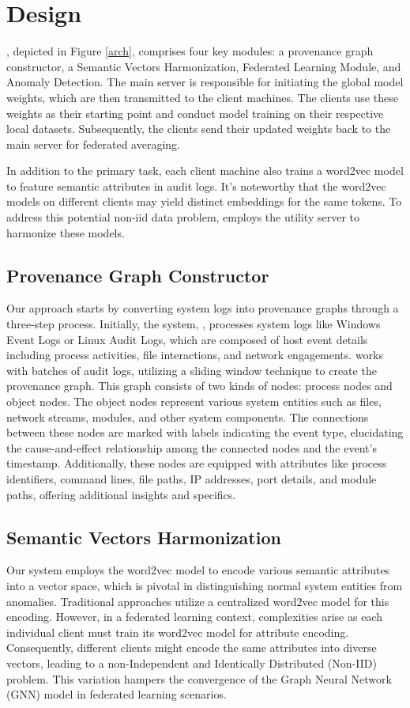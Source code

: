 \section{\Sys Design}
\label{sec:methodology}

\Sys, depicted in Figure \ref{arch}, comprises four key modules: a provenance graph constructor, a Semantic Vectors Harmonization, Federated Learning Module, and Anomaly Detection. The main server is responsible for initiating the global model weights, which are then transmitted to the client machines. The clients use these weights as their starting point and conduct model training on their respective local datasets. Subsequently, the clients send their updated weights back to the main server for federated averaging.

In addition to the primary task, each client machine also trains a word2vec model to feature semantic attributes in audit logs. It's noteworthy that the word2vec models on different clients may yield distinct embeddings for the same tokens. To address this potential non-iid data problem, \Sys employs the utility server to harmonize these models.

\subsection{Provenance Graph Constructor}
Our approach starts by converting system logs into provenance graphs through a three-step process. Initially, the system, \Sys, processes system logs like Windows Event Logs or Linux Audit Logs, which are composed of host event details including process activities, file interactions, and network engagements. \Sys works with batches of audit logs, utilizing a sliding window technique to create the provenance graph. This graph consists of two kinds of nodes: process nodes and object nodes. The object nodes represent various system entities such as files, network streams, modules, and other system components. The connections between these nodes are marked with labels indicating the event type, elucidating the cause-and-effect relationship among the connected nodes and the event's timestamp. Additionally, these nodes are equipped with attributes like process identifiers, command lines, file paths, IP addresses, port details, and module paths, offering additional insights and specifics.

\subsection{Semantic Vectors Harmonization}
Our system employs the word2vec model to encode various semantic attributes into a vector space, which is pivotal in distinguishing normal system entities from anomalies. Traditional approaches utilize a centralized word2vec model for this encoding. However, in a federated learning context, complexities arise as each individual client must train its word2vec model for attribute encoding. Consequently, different clients might encode the same attributes into diverse vectors, leading to a non-Independent and Identically Distributed (Non-IID) problem. This variation hampers the convergence of the Graph Neural Network (GNN) model in federated learning scenarios. 

